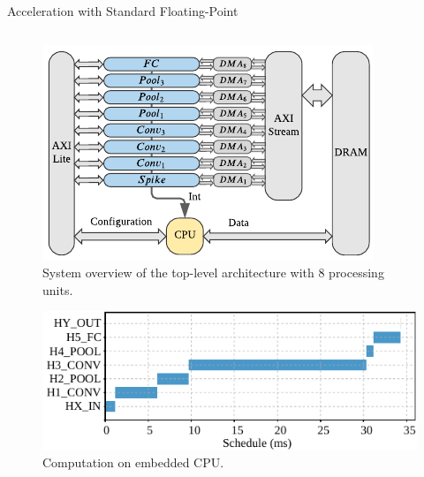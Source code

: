 \begin{frame}{Acceleration with Standard Floating-Point}
	\begin{columns}
		\begin{column}{0.5\textwidth}
			\begin{minipage}[c][.45\textheight][c]{\linewidth}
				\centering
				\begin{figure}
				\includegraphics[width=0.75\linewidth]{../chapters/sbs_accelerator/figures/sbs_hw_experimental.pdf} %
				\caption{\scriptsize System overview of the top-level architecture with 8 processing units.}
				\end{figure}
				\pause
			\end{minipage}
			
			\begin{minipage}[c][.45\textheight][c]{\linewidth}
				\centering
				\begin{figure}
				\includegraphics[width=0.75\linewidth]{../chapters/sbs_accelerator/figures/latency_sw.pdf} %
				\caption{\scriptsize Computation on embedded CPU.}
				\end{figure}
				\pause
			\end{minipage}
		\end{column}
		

\end{columns}
\end{frame}
